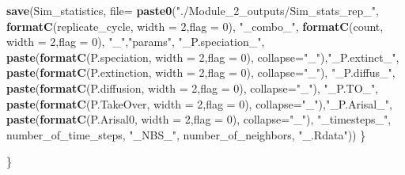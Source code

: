 \documentclass[]{book}
\newenvironment{Shaded}{\begin{snugshade}}{\end{snugshade}}
\newcommand{\KeywordTok}[1]{\textcolor[rgb]{0.13,0.29,0.53}{\textbf{{#1}}}}
\newcommand{\DataTypeTok}[1]{\textcolor[rgb]{0.13,0.29,0.53}{{#1}}}
\newcommand{\DecValTok}[1]{\textcolor[rgb]{0.00,0.00,0.81}{{#1}}}
\newcommand{\StringTok}[1]{\textcolor[rgb]{0.31,0.60,0.02}{{#1}}}
\newcommand{\NormalTok}[1]{{#1}}
\theoremstyle{definition}
\theoremstyle{definition}
\theoremstyle{definition}
\theoremstyle{remark}
\begin{document}
\begin{Shaded}
\begin{Highlighting}[]
{{    \KeywordTok{save}\NormalTok{(Sim_statistics, }\DataTypeTok{file=} \KeywordTok{paste0}\NormalTok{(}\StringTok{"./Module_2_outputs/Sim_stats_rep_"}\NormalTok{,}
                                      \KeywordTok{formatC}\NormalTok{(replicate_cycle, }\DataTypeTok{width =} \DecValTok{2}\NormalTok{,}\DataTypeTok{flag =} \DecValTok{0}\NormalTok{),}
                                      \StringTok{"_combo_"}\NormalTok{,}
                                      \KeywordTok{formatC}\NormalTok{(count, }\DataTypeTok{width =} \DecValTok{2}\NormalTok{,}\DataTypeTok{flag =} \DecValTok{0}\NormalTok{),}
                                      \StringTok{"_"}\NormalTok{,}\StringTok{"params"}\NormalTok{, }\StringTok{"_P.speciation_"}\NormalTok{,}
                                      \KeywordTok{paste}\NormalTok{(}\KeywordTok{formatC}\NormalTok{(P.speciation, }\DataTypeTok{width =} \DecValTok{2}\NormalTok{,}\DataTypeTok{flag =} \DecValTok{0}\NormalTok{), }\DataTypeTok{collapse=}\StringTok{"_"}\NormalTok{),}\StringTok{"_P.extinct_"}\NormalTok{,}
                                      \KeywordTok{paste}\NormalTok{(}\KeywordTok{formatC}\NormalTok{(P.extinction, }\DataTypeTok{width =} \DecValTok{2}\NormalTok{,}\DataTypeTok{flag =} \DecValTok{0}\NormalTok{), }\DataTypeTok{collapse=}\StringTok{"_"}\NormalTok{), }\StringTok{"_P.diffus_"}\NormalTok{,}
                                      \KeywordTok{paste}\NormalTok{(}\KeywordTok{formatC}\NormalTok{(P.diffusion, }\DataTypeTok{width =} \DecValTok{2}\NormalTok{,}\DataTypeTok{flag =} \DecValTok{0}\NormalTok{), }\DataTypeTok{collapse=}\StringTok{"_"}\NormalTok{), }\StringTok{"_P.TO_"}\NormalTok{,}
                                      \KeywordTok{paste}\NormalTok{(}\KeywordTok{formatC}\NormalTok{(P.TakeOver, }\DataTypeTok{width =} \DecValTok{2}\NormalTok{,}\DataTypeTok{flag =} \DecValTok{0}\NormalTok{), }\DataTypeTok{collapse=}\StringTok{"_"}\NormalTok{),}\StringTok{"_P.Arisal_"}\NormalTok{,}
                                      \KeywordTok{paste}\NormalTok{(}\KeywordTok{formatC}\NormalTok{(P.Arisal0, }\DataTypeTok{width =} \DecValTok{2}\NormalTok{,}\DataTypeTok{flag =} \DecValTok{0}\NormalTok{), }\DataTypeTok{collapse=}\StringTok{"_"}\NormalTok{),}
                                      \StringTok{"_timesteps_"}\NormalTok{, number_of_time_steps, }\StringTok{"_NBS_"}\NormalTok{, number_of_neighbors, }\StringTok{"_.Rdata"}\NormalTok{))}
\NormalTok{  \}}
  
\NormalTok{\}}

}}
\end{Highlighting}
\end{Shaded}
\end{document}
